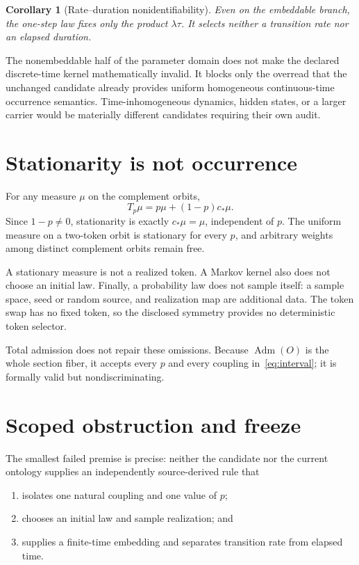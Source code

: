 \documentclass[11pt]{article}
\newtheorem{corollary}{Corollary}
\begin{document}
\begin{corollary}[Rate--duration nonidentifiability]
Even on the embeddable branch, the one-step law fixes only the product
$\lambda\tau$. It selects neither a transition rate nor an elapsed duration.
\end{corollary}

The nonembeddable half of the parameter domain does not make the declared
discrete-time kernel mathematically invalid. It blocks only the overread that
the unchanged candidate already provides uniform homogeneous continuous-time
occurrence semantics. Time-inhomogeneous dynamics, hidden states, or a larger
carrier would be materially different candidates requiring their own audit.

\section{Stationarity is not occurrence}

For any measure $\mu$ on the complement orbits,
\[
 T_p\mu=p\mu+(1-p)c_*\mu.
\]
Since $1-p\neq0$, stationarity is exactly $c_*\mu=\mu$, independent of $p$.
The uniform measure on a two-token orbit is stationary for every $p$, and
arbitrary weights among distinct complement orbits remain free.

A stationary measure is not a realized token. A Markov kernel also does not
choose an initial law. Finally, a probability law does not sample itself: a
sample space, seed or random source, and realization map are additional data.
The token swap has no fixed token, so the disclosed symmetry provides no
deterministic token selector.

Total admission does not repair these omissions. Because
$\operatorname{Adm}(O)$ is the whole section fiber, it accepts every $p$ and
every coupling in~\eqref{eq:interval}; it is formally valid but
nondiscriminating.

\section{Scoped obstruction and freeze}

The smallest failed premise is precise: neither the candidate nor the current
ontology supplies an independently source-derived rule that
\begin{enumerate}[label=(\roman*)]
 \item isolates one natural coupling and one value of $p$;
 \item chooses an initial law and sample realization; and
 \item supplies a finite-time embedding and separates transition rate from
 elapsed time.
\end{enumerate}
\end{document}
